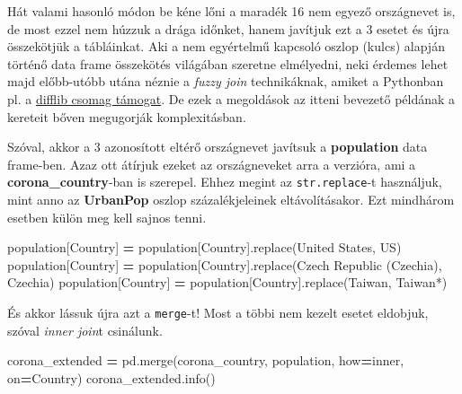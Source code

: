 \documentclass[
]{book}
\newenvironment{Shaded}{\begin{snugshade}}{\end{snugshade}}
\newcommand{\NormalTok}[1]{#1}
\newcommand{\OperatorTok}[1]{\textcolor[rgb]{0.81,0.36,0.00}{\textbf{#1}}}
\newcommand{\StringTok}[1]{\textcolor[rgb]{0.31,0.60,0.02}{#1}}
\begin{document}
Hát valami hasonló módon be kéne lőni a maradék 16 nem egyező országnevet is, de most ezzel nem húzzuk a drága időnket, hanem javítjuk ezt a 3 esetet és újra összekötjük a tábláinkat.
Aki a nem egyértelmű kapcsoló oszlop (kulcs) alapján történő data frame összekötés világában szeretne elmélyedni, neki érdemes lehet majd előbb-utóbb utána néznie a \emph{fuzzy join} technikáknak, amiket a Pythonban pl. a \href{https://stackoverflow.com/questions/13636848/is-it-possible-to-do-fuzzy-match-merge-with-python-pandas}{difflib csomag támogat}. De ezek a megoldások az itteni bevezető példának a kereteit bőven megugorják komplexitásban.

Szóval, akkor a 3 azonosított eltérő országnevet javítsuk a \textbf{population} data frame-ben. Azaz ott átírjuk ezeket az országneveket arra a verzióra, ami a \textbf{corona\_country}-ban is szerepel. Ehhez megint az \texttt{str.replace}-t használjuk, mint anno az \textbf{UrbanPop} oszlop százalékjeleinek eltávolításakor. Ezt mindhárom esetben külön meg kell sajnos tenni.

\begin{Shaded}
\begin{Highlighting}[]
\NormalTok{population[}\StringTok{\textquotesingle{}Country\textquotesingle{}}\NormalTok{] }\OperatorTok{=}\NormalTok{ population[}\StringTok{\textquotesingle{}Country\textquotesingle{}}\NormalTok{].replace(}\StringTok{\textquotesingle{}United States\textquotesingle{}}\NormalTok{, }\StringTok{\textquotesingle{}US\textquotesingle{}}\NormalTok{)}
\NormalTok{population[}\StringTok{\textquotesingle{}Country\textquotesingle{}}\NormalTok{] }\OperatorTok{=}\NormalTok{ population[}\StringTok{\textquotesingle{}Country\textquotesingle{}}\NormalTok{].replace(}\StringTok{\textquotesingle{}Czech Republic (Czechia)\textquotesingle{}}\NormalTok{, }\StringTok{\textquotesingle{}Czechia\textquotesingle{}}\NormalTok{)}
\NormalTok{population[}\StringTok{\textquotesingle{}Country\textquotesingle{}}\NormalTok{] }\OperatorTok{=}\NormalTok{ population[}\StringTok{\textquotesingle{}Country\textquotesingle{}}\NormalTok{].replace(}\StringTok{\textquotesingle{}Taiwan\textquotesingle{}}\NormalTok{, }\StringTok{\textquotesingle{}Taiwan*\textquotesingle{}}\NormalTok{)}
\end{Highlighting}
\end{Shaded}

És akkor lássuk újra azt a \texttt{merge}-t! Most a többi nem kezelt esetet eldobjuk, szóval \emph{inner join}t csinálunk.

\begin{Shaded}
\begin{Highlighting}[]
\NormalTok{corona\_extended }\OperatorTok{=}\NormalTok{ pd.merge(corona\_country, population, how}\OperatorTok{=}\StringTok{\textquotesingle{}inner\textquotesingle{}}\NormalTok{, on}\OperatorTok{=}\StringTok{\textquotesingle{}Country\textquotesingle{}}\NormalTok{)}
\NormalTok{corona\_extended.info()}
\end{Highlighting}
\end{Shaded}
\end{document}

